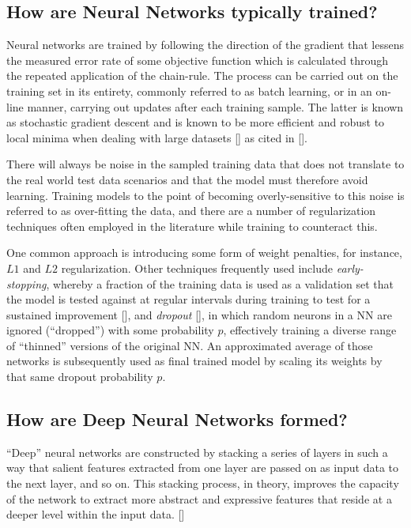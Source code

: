 \documentclass[12pt, a4paper]{report}
\theoremstyle{definition}
\theoremstyle{definition}%
\theoremstyle{definition}%
\theoremstyle{definition}%
\theoremstyle{definition}%
\theoremstyle{definition}%
\renewcommand{\cite}[1]{[\citealp{#1}]}
\begin{document}
\subsection{How are Neural Networks typically trained?}
Neural networks are trained by following the direction of the gradient that lessens the measured error rate of some objective function which is calculated through the repeated application of the chain-rule. The process can be carried out on the training set in its entirety, commonly referred to as batch learning, or in an on-line manner, carrying out updates after each training sample. The latter is known as stochastic gradient descent and is known to be more efficient and robust to local minima when dealing with large datasets \cite{lecun1998} as cited in \cite{graves2012b}. 

There will always be noise in the sampled training data that does not translate to the real world test data scenarios and that the model must therefore avoid learning. Training models to the point of becoming overly-sensitive to this noise is referred to as over-fitting the data, and there are a number of regularization techniques often employed in the literature while training to counteract this. 

One common approach is introducing some form of weight penalties, for instance, $L1$ and $L2$ regularization. Other techniques frequently used include \textit{early-stopping}, whereby a fraction of the training data is used as a validation set that the model is tested against at regular intervals during training to test for a sustained improvement \cite{graves2012}, and \textit{dropout} \cite{srivastava2014}, in which random neurons in a NN are ignored (\enquote{dropped}) with some probability $p$, effectively training a diverse range of \enquote{thinned} versions of the original NN. An approximated average of those networks is subsequently used as final trained model by scaling its weights by that same dropout probability $p$. 

\subsection{How are Deep Neural Networks formed?}
\enquote{Deep} neural networks are constructed by stacking a series of layers in such a way that salient features extracted from one layer are passed on as input data to the next layer, and so on. This stacking process, in theory, improves the capacity of the network to extract more abstract and expressive features that reside at a deeper level within the input data. \cite{zhang2018}  
\end{document}
